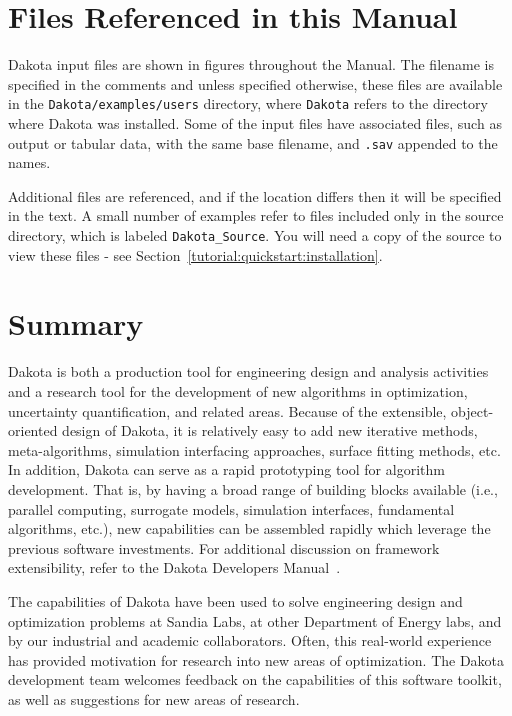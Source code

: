 \section{Files Referenced in this Manual}\label{intro:files}
Dakota input files are shown in figures throughout the Manual. 
The filename is specified in the comments
and unless specified otherwise, these
files are available in the {\tt Dakota/examples/users} directory,
where {\tt Dakota} refers to the directory where Dakota was installed. Some
of the input files have associated files, such as output or tabular data,
with the same base filename, and {\tt .sav} appended to the names.

Additional files are referenced, and if the location differs then it will
be specified in the text.
A small number of examples refer to files included only in the source
directory, which is labeled {\tt Dakota\_Source}. You will need a copy of
the source to view these files - see Section~\ref{tutorial:quickstart:installation}.

\section{Summary}\label{intro:summary}

Dakota is both a production tool for engineering design and analysis
activities and a research tool for the development of new algorithms
in optimization, uncertainty quantification, and related areas.
Because of the extensible, object-oriented design of Dakota, it is
relatively easy to add new iterative methods, meta-algorithms,
simulation interfacing approaches, surface fitting methods, etc. In
addition, Dakota can serve as a rapid prototyping tool for algorithm
development. That is, by having a broad range of building blocks
available (i.e., parallel computing, surrogate models, simulation
interfaces, fundamental algorithms, etc.), new capabilities can be
assembled rapidly which leverage the previous software investments.
For additional discussion on framework extensibility, refer to the
Dakota Developers Manual~\cite{DevMan}.

The capabilities of Dakota have been used to solve engineering design
and optimization problems at Sandia Labs, at other Department of
Energy labs, and by our industrial and academic collaborators. Often,
this real-world experience has provided motivation for research into
new areas of optimization. The Dakota development team welcomes
feedback on the capabilities of this software toolkit, as well as
suggestions for new areas of research.

